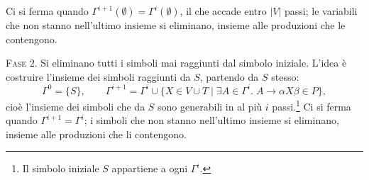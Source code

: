 \documentclass[a4paper, 11pt, oneside]{book}
\theoremstyle{formale}
\begin{document}
    Ci si ferma quando $\Gamma^{i+1}(\emptyset) = \Gamma^i(\emptyset)$, il che accade
    entro $|V|$ passi; le variabili che non stanno nell'ultimo insieme si eliminano,
    insieme alle produzioni che le contengono.

    \textsc{Fase 2}. Si eliminano tutti i simboli mai raggiunti dal simbolo iniziale.
    L'idea \`e costruire l'insieme dei simboli raggiunti da $S$, partendo da $S$
    stesso:
    \begin{equation*}
        \Gamma^0 = \{S\}, \qquad
        \Gamma^{i+1} = \Gamma^i \cup \{X \in V \cup T \mid \exists A \in \Gamma^i.\;
        A \to \alpha X \beta \in P\},
    \end{equation*}
    cio\`e l'insieme dei simboli che da $S$ sono generabili in al pi\`u $i$
    passi.\footnote{Il simbolo iniziale $S$ appartiene a ogni $\Gamma^i$.} Ci si ferma
    quando $\Gamma^{i+1} = \Gamma^i$; i simboli che non stanno nell'ultimo insieme si
    eliminano, insieme alle produzioni che li contengono.
\end{document}
